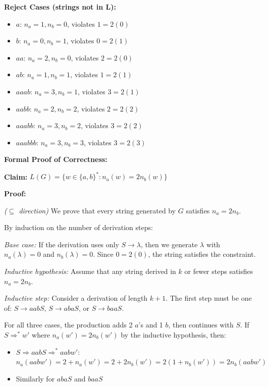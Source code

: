 \documentclass[12pt]{article}
\begin{document}
\textbf{Reject Cases (strings not in L):}
\begin{itemize}
\item $a$: $n_a=1, n_b=0$, violates $1 = 2(0)$ \texttimes
\item $b$: $n_a=0, n_b=1$, violates $0 = 2(1)$ \texttimes
\item $aa$: $n_a=2, n_b=0$, violates $2 = 2(0)$ \texttimes
\item $ab$: $n_a=1, n_b=1$, violates $1 = 2(1)$ \texttimes
\item $aaab$: $n_a=3, n_b=1$, violates $3 = 2(1)$ \texttimes
\item $aabb$: $n_a=2, n_b=2$, violates $2 = 2(2)$ \texttimes
\item $aaabb$: $n_a=3, n_b=2$, violates $3 = 2(2)$ \texttimes
\item $aaabbb$: $n_a=3, n_b=3$, violates $3 = 2(3)$ \texttimes
\end{itemize}

\textbf{Formal Proof of Correctness:}

\textbf{Claim:} $L(G) = \{w \in \{a,b\}^* : n_a(w) = 2n_b(w)\}$

\textbf{Proof:}

\textit{($\subseteq$ direction)} We prove that every string generated by $G$ satisfies $n_a = 2n_b$.

By induction on the number of derivation steps:

\textit{Base case:} If the derivation uses only $S \rightarrow \lambda$, then we generate $\lambda$ with $n_a(\lambda) = 0$ and $n_b(\lambda) = 0$. Since $0 = 2(0)$, the string satisfies the constraint.

\textit{Inductive hypothesis:} Assume that any string derived in $k$ or fewer steps satisfies $n_a = 2n_b$.

\textit{Inductive step:} Consider a derivation of length $k+1$. The first step must be one of: $S \rightarrow aabS$, $S \rightarrow abaS$, or $S \rightarrow baaS$.

For all three cases, the production adds 2 $a$'s and 1 $b$, then continues with $S$. If $S \Rightarrow^* w'$ where $n_a(w') = 2n_b(w')$ by the inductive hypothesis, then:
\begin{itemize}
\item $S \Rightarrow aabS \Rightarrow^* aabw'$: $n_a(aabw') = 2 + n_a(w') = 2 + 2n_b(w') = 2(1 + n_b(w')) = 2n_b(aabw')$ \checkmark
\item Similarly for $abaS$ and $baaS$
\end{itemize}
\end{document}
